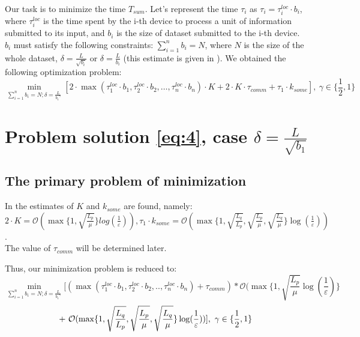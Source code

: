 \documentclass{article}
\begin{document}
Our task is to minimize the time $T_{sum}$. Let's represent the time $\tau_i$ as $\tau_i = \tau_i^{loc}\cdot b_i$, where $\tau_i^{loc}$ is the time spent by the i-th device to process a unit of information submitted to its input, and $b_i$ is the size of dataset submitted to the i-th device. $b_i$ must satisfy the following constraints: $\sum\limits_{i = 1}^{n} b_i = N$, where $N$ is the size of the whole dataset, $\delta = \frac{L}{\sqrt{b_i}}$ or $\delta = \frac{L}{b_i}$ (this estimate is given in \cite{kovalev2022optimal}).
We obtained the following optimization problem:
\begin{equation}
    \label{eq:4}
    \underset{\sum\limits_{i = 1}^{n} b_i = N; \delta = \frac{L}{{b_1}^{\gamma}}}{\min}[ 2\cdot\max(\tau_1^{loc}\cdot b_1, \tau_2^{loc}\cdot b_2, \ldots, \tau_n^{loc}\cdot b_n)\cdot K + 2\cdot K\cdot\tau_{comm} + \tau_1\cdot k_{some}], ~ \gamma \in \{\frac{1}{2}, 1\}
\end{equation}
\section{Problem solution \ref{eq:4}, case $\delta = \frac{L}{\sqrt{b_1}}$}

\subsection{The primary problem of minimization}
In \cite{kovalev2022optimal} the estimates of $K$ and $k_{some}$ are found, namely: \\ $2\cdot K = \mathcal O(\max\{1, \sqrt{\frac{L_p}{\mu}}\}log(\frac{1}{\varepsilon})), \tau_1\cdot k_{some} = \mathcal O(\max\{1, \sqrt{\frac{L_q}{L_p}}, \sqrt{\frac{L_p}{\mu}}, \sqrt{\frac{L_q}{\mu}}\}\log(\frac{1}{\varepsilon}))$. \\ The value of $\tau_{comm}$ will be determined later. 

Thus, our minimization problem is reduced to:
\begin{equation}
    \label{eq:5}
    \underset{\sum\limits_{i = 1}^{n} b_i = N; \delta = \frac{L}{{b_1}^\gamma}}{\min}[(\max(\tau_1^{loc}\cdot b_1, \tau_2^{loc}\cdot b_2, . ., \tau_n^{loc}\cdot b_n) + \tau_{comm}) * \mathcal O(\max\{1, \sqrt{\frac{L_p}{\mu}}\log(\frac{1}{\varepsilon})\} 
\end{equation}
\begin{equation}
     \notag
     + ~
    \mathcal O(\max\{1,\sqrt{\frac{L_q}{L_p}}, \sqrt{\frac{L_p}{\mu}}, \sqrt{\frac{L_q}{\mu}}\}\log(\frac{1}{\varepsilon}))] ,  ~ \gamma \in \{\frac{1}{2}, 1\}
\end{equation}
\end{document}
